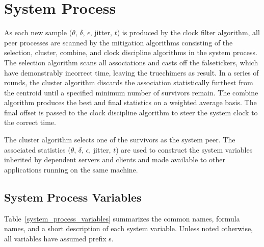 \chapter{System Process}
\label{section-11}

As each new sample ($ \theta $, $ \delta $, $ \epsilon $, jitter, $ t $) is produced by
the clock filter algorithm, all peer processes are scanned by the
mitigation algorithms consisting of the selection, cluster, combine,
and clock discipline algorithms in the system process. The selection
algorithm scans all associations and casts off the falsetickers,
which have demonstrably incorrect time, leaving the truechimers as
result. In a series of rounds, the cluster algorithm discards the
association statistically furthest from the centroid until a
specified minimum number of survivors remain. The combine algorithm
produces the best and final statistics on a weighted average basis.
The final offset is passed to the clock discipline algorithm to steer
the system clock to the correct time.

The cluster algorithm selects one of the survivors as the system
peer. The associated statistics ($ \theta $, $ \delta $, $ \epsilon $, jitter, $ t $)
are used to construct the system variables inherited by dependent
servers and clients and made available to other applications running
on the same machine.

\section{System Process Variables}
\label{section-11-1}

Table~\ref{system_process_variables} summarizes the common names, formula names, and a short
description of each system variable. Unless noted otherwise, all
variables have assumed prefix s.

